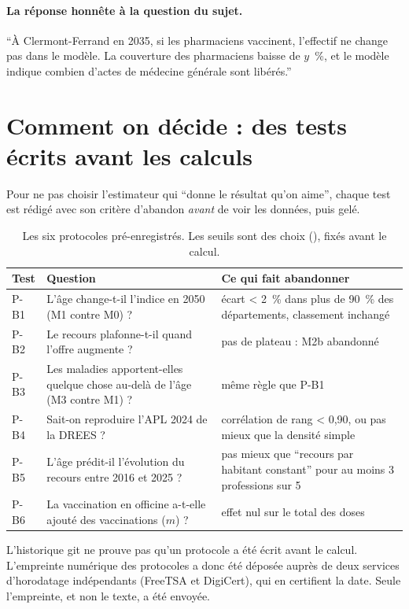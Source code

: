 \documentclass[11pt]{article}
\begin{document}
\paragraph{La réponse honnête à la question du sujet.} \enquote{À Clermont-Ferrand en 2035, si les pharmaciens
vaccinent, l'effectif ne change pas dans le modèle. La couverture des pharmaciens baisse de $y$~\%, et le modèle
indique combien d'actes de médecine générale sont libérés.}

\section{Comment on décide : des tests écrits avant les calculs}
Pour ne pas choisir l'estimateur qui \enquote{donne le résultat qu'on aime}, chaque test est rédigé avec son critère
d'abandon \emph{avant} de voir les données, puis gelé.

\begin{table}[h]
\centering\small
\begin{tabularx}{\linewidth}{@{}l X X@{}}
\toprule
\textbf{Test} & \textbf{Question} & \textbf{Ce qui fait abandonner} \\
\midrule
P-B1 & L'âge change-t-il l'indice en 2050 (M1 contre M0) ? & écart < 2~\%\suppose{} dans plus de 90~\%\suppose{} des départements, classement inchangé \\
P-B2 & Le recours plafonne-t-il quand l'offre augmente ? & pas de plateau : M2b abandonné \\
P-B3 & Les maladies apportent-elles quelque chose au-delà de l'âge (M3 contre M1) ? & même règle que P-B1 \\
P-B4 & Sait-on reproduire l'APL 2024 de la DREES ? & corrélation de rang < 0,90\suppose{}, ou pas mieux que la densité simple \\
P-B5 & L'âge prédit-il l'évolution du recours entre 2016 et 2025 ? & pas mieux que \enquote{recours par habitant constant} pour au moins 3 professions sur 5 \\
P-B6 & La vaccination en officine a-t-elle ajouté des vaccinations ($m$) ? & effet nul sur le total des doses \\
\bottomrule
\end{tabularx}
\caption{Les six protocoles pré-enregistrés. Les seuils sont des choix (\suppose), fixés avant le calcul.}
\end{table}

L'historique git ne prouve pas qu'un protocole a été écrit avant le calcul. L'empreinte numérique des protocoles a donc
été déposée auprès de deux services d'horodatage indépendants (FreeTSA et DigiCert), qui en certifient la date.
Seule l'empreinte, et non le texte, a été envoyée.
\end{document}
